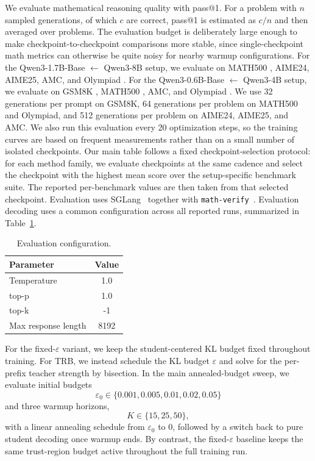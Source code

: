 \documentclass{llmxive}
\begin{document}
We evaluate mathematical reasoning quality with pass@1.
For a problem with $n$ sampled generations, of which $c$ are correct, pass@1 is estimated as $c/n$ and then averaged over problems.
The evaluation budget is deliberately large enough to make checkpoint-to-checkpoint comparisons more stable, since single-checkpoint math metrics can otherwise be quite noisy for nearby warmup configurations.
For the Qwen3-1.7B-Base $\leftarrow$ Qwen3-8B setup, we evaluate on MATH500 \citep{hendrycks2021math}, AIME24, AIME25, AMC, and Olympiad \citep{he2024olympiadbench}.
For the Qwen3-0.6B-Base $\leftarrow$ Qwen3-4B setup, we evaluate on GSM8K \citep{cobbe2021training}, MATH500 \citep{hendrycks2021math}, AMC, and Olympiad \citep{he2024olympiadbench}.
We use 32 generations per prompt on GSM8K, 64 generations per problem on MATH500 and Olympiad, and 512 generations per problem on AIME24, AIME25, and AMC.
We also run this evaluation every 20 optimization steps, so the training curves are based on frequent measurements rather than on a small number of isolated checkpoints.
Our main table follows a fixed checkpoint-selection protocol: for each method family, we evaluate checkpoints at the same cadence and select the checkpoint with the highest mean score over the setup-specific benchmark suite.
The reported per-benchmark values are then taken from that selected checkpoint.
Evaluation uses SGLang~\citep{sglang} together with \texttt{math-verify}~\citep{mathverify}.
Evaluation decoding uses a common configuration across all reported runs, summarized in Table~\ref{tab:eval-config}.

\begin{table}[!htbp]
\centering
\small
\begin{tabular}{lc}
\toprule
\textbf{Parameter} & \textbf{Value} \\
\midrule
Temperature & 1.0 \\
top-p & 1.0 \\
top-k & -1 \\
Max response length & 8192 \\
\bottomrule
\end{tabular}
\caption{Evaluation configuration.}
\label{tab:eval-config}
\end{table}

For the fixed-$\varepsilon$ variant, we keep the student-centered KL budget fixed throughout training.
For TRB, we instead schedule the KL budget $\varepsilon$ and solve for the per-prefix teacher strength by bisection.
In the main annealed-budget sweep, we evaluate initial budgets
\[
\varepsilon_0 \in \{0.001, 0.005, 0.01, 0.02, 0.05\}
\]
and three warmup horizons,
\[
K \in \{15, 25, 50\},
\]
with a linear annealing schedule from $\varepsilon_0$ to $0$, followed by a switch back to pure student decoding once warmup ends.
By contrast, the fixed-$\varepsilon$ baseline keeps the same trust-region budget active throughout the full training run.
\end{document}
